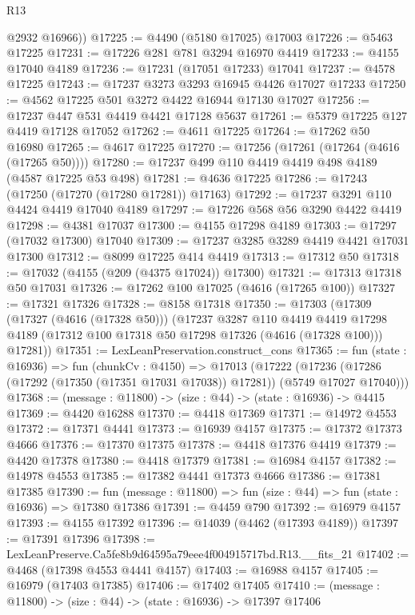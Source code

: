 \begin{lexlean}{R13}
\begin{coremodule}
        @2932
        @16966))
@17225 := @4490 (@5180 @17025) @17003
@17226 := @5463 @17225
@17231 := @17226 @281 @781 @3294 @16970 @4419
@17233 := @4155 @17040 @4189
@17236 := @17231 (@17051 @17233) @17041
@17237 := @4578 @17225
@17243 := @17237 @3273 @3293 @16945 @4426 @17027 @17233
@17250 := @4562 @17225 @501 @3272 @4422 @16944 @17130 @17027
@17256 := @17237 @447 @531 @4419 @4421 @17128 @5637
@17261 := @5379 @17225 @127 @4419 @17128 @17052
@17262 := @4611 @17225
@17264 := @17262 @50 @16980
@17265 := @4617 @17225
@17270 := @17256 (@17261 (@17264 (@4616 (@17265 @50))))
@17280 := @17237 @499 @110 @4419 @4419 @498 @4189 (@4587 @17225 @53 @498)
@17281 := @4636 @17225
@17286 := @17243 (@17250 (@17270 (@17280 @17281)) @17163)
@17292 := @17237 @3291 @110 @4424 @4419 @17040 @4189
@17297 := @17226 @568 @56 @3290 @4422 @4419
@17298 := @4381 @17037
@17300 := @4155 @17298 @4189
@17303 := @17297 (@17032 @17300) @17040
@17309 := @17237 @3285 @3289 @4419 @4421 @17031 @17300
@17312 := @8099 @17225 @414 @4419
@17313 := @17312 @50
@17318 := @17032 (@4155 (@209 (@4375 @17024)) @17300)
@17321 := @17313 @17318 @50 @17031
@17326 := @17262 @100 @17025 (@4616 (@17265 @100))
@17327 := @17321 @17326
@17328 := @8158 @17318
@17350 := @17303
    (@17309
      (@17327 (@4616 (@17328 @50)))
      (@17237
        @3287
        @110
        @4419
        @4419
        @17298
        @4189
        (@17312 @100 @17318 @50 @17298 @17326 (@4616 (@17328 @100)))
        @17281))
@17351 := LexLeanPreservation.construct_cons
@17365 := fun (state : @16936) =>
  fun (chunkCv : @4150) =>
  @17013
    (@17222 (@17236 (@17286 (@17292 (@17350 (@17351 @17031 @17038)) @17281)) (@5749 @17027 @17040)))
@17368 := (message : @11800) -> (size : @44) -> (state : @16936) -> @4415
@17369 := @4420 @16288
@17370 := @4418 @17369
@17371 := @14972 @4553
@17372 := @17371 @4441
@17373 := @16939 @4157
@17375 := @17372 @17373 @4666
@17376 := @17370 @17375
@17378 := @4418 @17376 @4419
@17379 := @4420 @17378
@17380 := @4418 @17379
@17381 := @16984 @4157
@17382 := @14978 @4553
@17385 := @17382 @4441 @17373 @4666
@17386 := @17381 @17385
@17390 := fun (message : @11800) => fun (size : @44) => fun (state : @16936) => @17380 @17386
@17391 := @4459 @790
@17392 := @16979 @4157
@17393 := @4155 @17392
@17396 := @14039 (@4462 (@17393 @4189))
@17397 := @17391 @17396
@17398 := LexLeanPreserve.Ca5fe8b9d64595a79eee4f004915717bd.R13.__fits_21
@17402 := @4468 (@17398 @4553 @4441 @4157)
@17403 := @16988 @4157
@17405 := @16979 (@17403 @17385)
@17406 := @17402 @17405
@17410 := (message : @11800) -> (size : @44) -> (state : @16936) -> @17397 @17406

\end{coremodule}
\end{lexlean}
